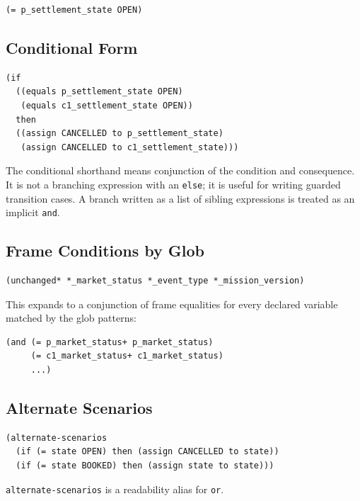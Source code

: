 \documentclass[11pt]{article}
\begin{document}
\begin{lstlisting}[language=DSTR]
(= p_settlement_state OPEN)
\end{lstlisting}

\subsection{Conditional Form}

\begin{lstlisting}[language=DSTR]
(if
  ((equals p_settlement_state OPEN)
   (equals c1_settlement_state OPEN))
  then
  ((assign CANCELLED to p_settlement_state)
   (assign CANCELLED to c1_settlement_state)))
\end{lstlisting}

The conditional shorthand means conjunction of the condition and consequence.
It is not a branching expression with an \texttt{else}; it is useful for
writing guarded transition cases.  A branch written as a list of sibling
expressions is treated as an implicit \texttt{and}.

\subsection{Frame Conditions by Glob}

\begin{lstlisting}[language=DSTR]
(unchanged* *_market_status *_event_type *_mission_version)
\end{lstlisting}

This expands to a conjunction of frame equalities for every declared variable
matched by the glob patterns:

\begin{lstlisting}[language=DSTR]
(and (= p_market_status+ p_market_status)
     (= c1_market_status+ c1_market_status)
     ...)
\end{lstlisting}

\subsection{Alternate Scenarios}

\begin{lstlisting}[language=DSTR]
(alternate-scenarios
  (if (= state OPEN) then (assign CANCELLED to state))
  (if (= state BOOKED) then (assign state to state)))
\end{lstlisting}

\texttt{alternate-scenarios} is a readability alias for \texttt{or}.
\end{document}
